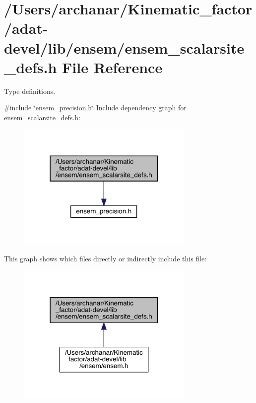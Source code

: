 \hypertarget{adat-devel_2lib_2ensem_2ensem__scalarsite__defs_8h}{}\section{/\+Users/archanar/\+Kinematic\+\_\+factor/adat-\/devel/lib/ensem/ensem\+\_\+scalarsite\+\_\+defs.h File Reference}
\label{adat-devel_2lib_2ensem_2ensem__scalarsite__defs_8h}


Type definitions.  


{\ttfamily \#include \char`\"{}ensem\+\_\+precision.\+h\char`\"{}}\newline
Include dependency graph for ensem\+\_\+scalarsite\+\_\+defs.\+h\+:
\nopagebreak
\begin{figure}[H]
\begin{center}
\leavevmode
\includegraphics[width=242pt]{d9/ddc/adat-devel_2lib_2ensem_2ensem__scalarsite__defs_8h__incl}
\end{center}
\end{figure}
This graph shows which files directly or indirectly include this file\+:
\nopagebreak
\begin{figure}[H]
\begin{center}
\leavevmode
\includegraphics[width=242pt]{db/d3f/adat-devel_2lib_2ensem_2ensem__scalarsite__defs_8h__dep__incl}
\end{center}
\end{figure}
